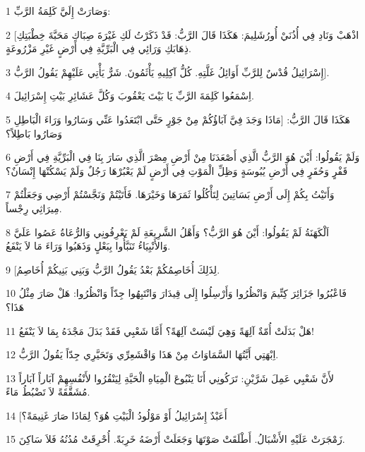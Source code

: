 \par 1 وَصَارَتْ إِلَيَّ كَلِمَةُ الرَّبِّ:
\par 2 [اذْهَبْ وَنَادِ فِي أُذُنَيْ أُورُشَلِيمَ: هَكَذَا قَالَ الرَّبُّ: قَدْ ذَكَرْتُ لَكِ غَيْرَةَ صِبَاكِ مَحَبَّةَ خِطْبَتِكِ ذِهَابَكِ وَرَائِي فِي الْبَرِّيَّةِ فِي أَرْضٍ غَيْرِ مَزْرُوعَةٍ.
\par 3 إِسْرَائِيلُ قُدْسٌ لِلرَّبِّ أَوَائِلُ غَلَّتِهِ. كُلُّ آكِلِيهِ يَأْثَمُونَ. شَرٌّ يَأْتِي عَلَيْهِمْ يَقُولُ الرَّبُّ].
\par 4 اِسْمَعُوا كَلِمَةَ الرَّبِّ يَا بَيْتَ يَعْقُوبَ وَكُلَّ عَشَائِرِ بَيْتِ إِسْرَائِيلَ.
\par 5 هَكَذَا قَالَ الرَّبُّ: [مَاذَا وَجَدَ فِيَّ آبَاؤُكُمْ مِنْ جَوْرٍ حَتَّى ابْتَعَدُوا عَنِّي وَسَارُوا وَرَاءَ الْبَاطِلِ وَصَارُوا بَاطِلاً؟
\par 6 وَلَمْ يَقُولُوا: أَيْنَ هُوَ الرَّبُّ الَّذِي أَصْعَدَنَا مِنْ أَرْضِ مِصْرَ الَّذِي سَارَ بِنَا فِي الْبَرِّيَّةِ فِي أَرْضِ قَفْرٍ وَحُفَرٍ فِي أَرْضِ يُبُوسَةٍ وَظِلِّ الْمَوْتِ فِي أَرْضٍ لَمْ يَعْبُرْهَا رَجُلٌ وَلَمْ يَسْكُنْهَا إِنْسَانٌ؟
\par 7 وَأَتَيْتُ بِكُمْ إِلَى أَرْضِ بَسَاتِينَ لِتَأْكُلُوا ثَمَرَهَا وَخَيْرَهَا. فَأَتَيْتُمْ وَنَجَّسْتُمْ أَرْضِي وَجَعَلْتُمْ مِيرَاثِي رِجْساً.
\par 8 اَلْكَهَنَةُ لَمْ يَقُولُوا: أَيْنَ هُوَ الرَّبُّ؟ وَأَهْلُ الشَّرِيعَةِ لَمْ يَعْرِفُونِي وَالرُّعَاةُ عَصُوا عَلَيَّ وَالأَنْبِيَاءُ تَنَبَّأُوا بِبَعْلٍ وَذَهَبُوا وَرَاءَ مَا لاَ يَنْفَعُ.
\par 9 [لِذَلِكَ أُخَاصِمُكُمْ بَعْدُ يَقُولُ الرَّبُّ وَبَنِي بَنِيكُمْ أُخَاصِمُ.
\par 10 فَاعْبُرُوا جَزَائِرَ كِتِّيمَ وَانْظُرُوا وَأَرْسِلُوا إِلَى قِيدَارَ وَانْتَبِهُوا جِدّاً وَانْظُرُوا: هَلْ صَارَ مِثْلُ هَذَا؟
\par 11 هَلْ بَدَلَتْ أُمّةٌ آلِهَةً وَهِيَ لَيْسَتْ آلِهَةً؟ أَمَّا شَعْبِي فَقَدْ بَدَلَ مَجْدَهُ بِمَا لاَ يَنْفَعُ!
\par 12 اِبْهَتِي أَيَّتُهَا السَّمَاوَاتُ مِنْ هَذَا وَاقْشَعِرِّي وَتَحَيَّرِي جِدّاً يَقُولُ الرَّبُّ.
\par 13 لأَنَّ شَعْبِي عَمِلَ شَرَّيْنِ: تَرَكُونِي أَنَا يَنْبُوعَ الْمِيَاهِ الْحَيَّةِ لِيَنْقُرُوا لأَنْفُسِهِمْ آبَاراً آبَاراً مُشَقَّقَةً لاَ تَضْبُطُ مَاءً.
\par 14 [أَعَبْدٌ إِسْرَائِيلُ أَوْ مَوْلُودُ الْبَيْتِ هُوَ؟ لِمَاذَا صَارَ غَنِيمَةً؟
\par 15 زَمْجَرَتْ عَلَيْهِ الأَشْبَالُ. أَطْلَقَتْ صَوْتَهَا وَجَعَلَتْ أَرْضَهُ خَرِبَةً. أُحْرِقَتْ مُدُنُهُ فَلاَ سَاكِنَ.

